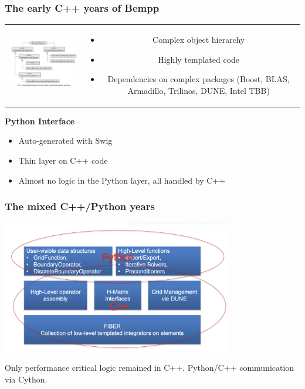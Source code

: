 \documentclass[dvipsnames,10pt]{beamer}
\begin{document}
\begin{frame}
	\frametitle{The early C++ years of Bempp}
	
	\begin{tabular}{cc}
		\begin{minipage}{6cm}
			\begin{center}
			\includegraphics[width=6cm]{../figs/bempp_cpp_objects}
			\end{center}
		\end{minipage} &
		\begin{minipage}{5cm}
			\small
			\begin{itemize}
			\item Complex object hierarchy
			\item Highly templated code
			\item Dependencies on complex packages (Boost, BLAS, Armadillo, Trilinos, DUNE, Intel TBB)
			\end{itemize}
		\end{minipage}
	\end{tabular}
	
	\vspace{\baselineskip}
	
	\textbf{Python Interface}
	
	\begin{itemize}
		\item Auto-generated with Swig
		\item Thin layer on C++ code
		\item Almost no logic in the Python layer, all handled by C++
	\end{itemize}
\end{frame}
		
\begin{frame}
	\frametitle{The mixed C++/Python years}
	
	\begin{center}
	\includegraphics[width=10cm]{../figs/cpp_python_mixed.png}
	\end{center}
	
	Only performance critical logic remained in C++. Python/C++ communication
	via Cython.
\end{frame}
	
\end{document}
